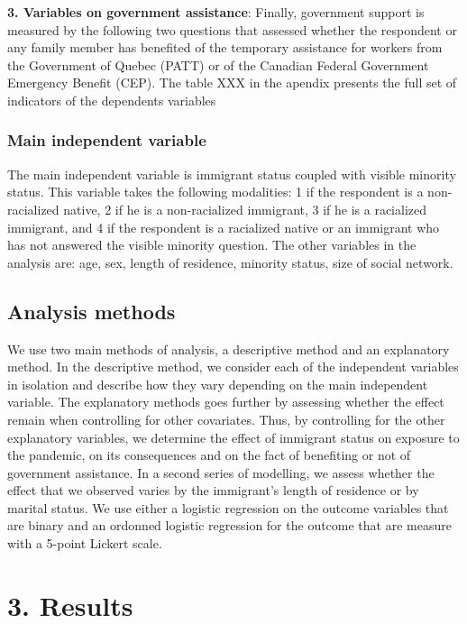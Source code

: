 \documentclass[
]{article}
\begin{document}
\textbf{3. Variables on government assistance}: Finally, government support is
measured by the following two questions that assessed whether the respondent or
any family member has benefited of the temporary assistance for workers from the
Government of Quebec (PATT) or of the Canadian Federal Government Emergency
Benefit (CEP). The table XXX in the apendix presents the full set of indicators
of the dependents variables

\hypertarget{main-independent-variable-1}{%
\subsubsection{Main independent variable}\label{main-independent-variable-1}}

The main independent variable is immigrant status coupled with visible minority
status. This variable takes the following modalities: 1 if the respondent is a
non-racialized native, 2 if he is a non-racialized immigrant, 3 if he is a
racialized immigrant, and 4 if the respondent is a racialized native or an
immigrant who has not answered the visible minority question. The other
variables in the analysis are: age, sex, length of residence, minority status,
size of social network.

\hypertarget{analysis-methods-1}{%
\subsection{Analysis methods}\label{analysis-methods-1}}

We use two main methods of analysis, a descriptive method and an explanatory
method. In the descriptive method, we consider each of the independent variables
in isolation and describe how they vary depending on the main independent
variable. The explanatory methods goes further by assessing whether the effect
remain when controlling for other covariates. Thus, by controlling for the other
explanatory variables, we determine the effect of immigrant status on exposure
to the pandemic, on its consequences and on the fact of benefiting or not of
government assistance. In a second series of modelling, we assess whether the
effect that we observed varies by the immigrant's length of residence or by
marital status. We use either a logistic regression on the outcome variables
that are binary and an ordonned logistic regression for the outcome that are
measure with a 5-point Lickert scale.

\newpage

\hypertarget{results-1}{%
\section{3. Results}\label{results-1}}
\end{document}
